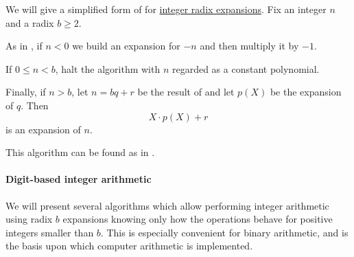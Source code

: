\begin{algorithm}\label{alg:integer_radix_expansion}
  We will give a simplified form of  for \hyperref[def:integer_radix_expansion]{integer radix expansions}. Fix an integer \( n \) and a radix \( b \geq 2 \).

  \begin{thmenum}
     As in , if \( n < 0 \) we build an expansion for \( -n \) and then multiply it by \( -1 \).

     If \( 0 \leq n < b \), halt the algorithm with \( n \) regarded as a constant polynomial.

     Finally, if \( n > b \), let \( n = bq + r \) be the result of  and let \( p(X) \) be the expansion of \( q \). Then
    \begin{equation*}
      X \cdot p(X) + r
    \end{equation*}
    is an expansion of \( n \).
  \end{thmenum}
\end{algorithm}
\begin{comments}
  \item This algorithm can be found as  in \cite{notebook:code}.
\end{comments}

\paragraph{Digit-based integer arithmetic}

We will present several algorithms which allow performing integer arithmetic using radix \( b \) expansions knowing only how the operations behave for positive integers smaller than \( b \). This is especially convenient for binary arithmetic, and is the basis upon which computer arithmetic is implemented.

